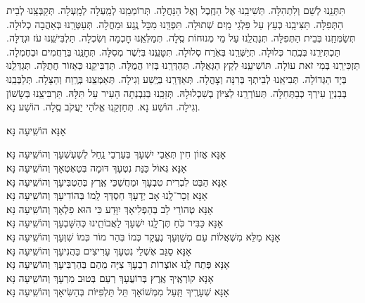 \documentclass[twoside, openany, parskip=half, 11pt]{book}
\begin{document}
תִּתְּנֵֽנוּ לְשֵׁם וְלִתְהִלָּה. תְּשִׁיבֵֽנוּ אֶל הַחֶֽבֶל וְאֶל הַנַּחֲלָה. תְּרוֹמְמֵֽנוּ לְמַֽעְלָה לְמָֽעְלָה. תְּקַבְּצֵֽנוּ לְבֵית הַתְּפִלָּה. תַּצִּיבֵֽנוּ כְּעֵץ עַל פַּלְגֵי מַֽיִם שְׁתוּלָה. תִּפְדֵּֽנוּ מִכׇּל נֶֽגַע וּמַחֲלָה. תְּעַטְּרֵֽנוּ בְּאַהֲבָה כְלוּלָה. תְּשַׂמְּחֵֽנוּ בְּבֵית הַתְּפִלָּה. תְּנַהֲלֵֽנוּ עַל מֵי מְנוּחוֹת סֶֽלָה. תְּמַלְּאֵֽנוּ חׇכְמָה וְשִׂכְלָה. תַּלְבִּישֵֽׁנוּ עֹז וּגְדֻלָּה. תַּכְתִּירֵֽנוּ בְּכֶֽתֶר כְּלוּלָה. תְּיַשְּׁרֵֽנוּ בְּאֹֽרַח סְלוּלָה. תִּטָּעֵֽנוּ בְּיֹֽשֶׁר מְסִלָּה. תְּחׇנֵּֽנוּ בְּרַחֲמִים וּבְחֶמְלָה. תַּזְכִּירֵֽנוּ בְּמִי זֹאת עוֹלָה. תּוֹשִׁיעֵֽנוּ לְקֵץ הַגְּאֻלָּה. תְּהַדְּרֵֽנוּ בְּזִיו הֲמֻלָּה. תַּדְבִּיקֵֽנוּ כְּאֵזוֹר חֲתֻלָּה. תְּגַדְּלֵֽנוּ בְּיָד הַגְּדוֹלָה. תְּבִיאֵֽנוּ לְבֵיתְךָ בְּרִנָּה וְצׇהֳלָה. תְּאַדְּרֵֽנוּ בְּיֶֽשַׁע וְגִילָה. תְּאַמְּצֵֽנוּ בְּרֶֽוַח וְהַצָּלָה. תְּלַבְּבֵֽנוּ בְּבִנְיַן עִירְךָ כְּבַתְּחִלָּה. תְּעוֹרְרֵֽנוּ לְצִיּוֹן בְשִׁכְלוּלָהּ. תְּזַכֵּֽנוּ בְּנִבְנְתָה הָעִיר עַל תִּלָּהּ. תַּרְבִּיצֵֽנוּ בְּשָׂשׁוֹן וְגִילָה. הוֹשַׁע נָא. תְּחַזְקֵֽנוּ אֱלֹהֵי יַעֲקֹב סֶֽלָה. הוֹשַׁע נָא. 

\begin{large}אָנָּא הוֹשִֽׁיעָה נָּא׃\end{large}

\begin{small}
אָנָּא אֱזוֹן חִין תְּאֵבֵי יִשְׁעָךְ בְּעַרְבֵי נַֽחַל לְשַׁעְשְׁעָךְ \hfill וְהוֹשִֽׁיעָה נָּא׃\\
אָנָּא גְּאוֹל כַּנַּת נִטְעָךְ דּוּמָה בְּטַאְטְאָךְ \hfill וְהוֹשִֽׁיעָה נָּא׃\\
אָנָּא הַבֵּט לִבְרִית טִבְעָךְ וּמַחֲשַׁכֵּי אֶֽרֶץ בְּהַטְבִּיעָךְ \hfill וְהוֹשִֽׁיעָה נָּא׃\\
אָנָּא זְכָר־לָֽנוּ אָב יְדָעָךְ חַסְדְּךָ לָֽמוֹ בְּהוֹדִיעָךְ \hfill וְהוֹשִֽׁיעָה נָּא׃\\
אָנָּא טְהוֹרֵי לֵב בְּהַפְלִיאָךְ יִוָּדַע כִּי הוּא פִלְאָךְ \hfill וְהוֹשִֽׁיעָה נָּא׃\\
אָנָּא כַּבִּיר כֹּֽחַ תֶּן־לָֽנוּ יִשְׁעָךְ לַאֲבוֹתֵֽינוּ כְּהִשָּׁבְעָךְ \hfill וְהוֹשִֽׁיעָה נָּא׃\\
אָנָּא מַלֵּא מִשְׁאֲלוֹת עַם מְשַׁוְּעָךְ נֶעֱקָד כְּמוֹ בְּהַר מוֹר כְּמוֹ שִׁוְּעָךְ \hfill וְהוֹשִֽׁיעָה נָּא׃\\
אָנָּא סַגֵּב אֶשְׁלֵי נִטְעָךְ עָרִיצִים בַּהֲנִיעָךְ \hfill וְהוֹשִֽׁיעָה נָּא׃\\
אָנָּא פְּתַח לָֽנוּ אוֹצְרוֹת רִבְעָךְ צִיָּה מֵהֶם בְּהַרְבִּיעָךְ \hfill וְהוֹשִֽׁיעָה נָּא׃\\
אָנָּא קוֹרְאֶֽיךָ אֶֽרֶץ בְּרוֹעֲעָךְ רְעֵם בְּטוּב מִרְעָךְ \hfill וְהוֹשִֽׁיעָה נָּא׃\\
אָנָּא שְׁעָרֶֽיךָ תַּֽעַל מִמְּשׁוֹאָךְ תֵּל תַּלְפִּיּוֹת בְּהַשִּׂיאָךְ \hfill וְהוֹשִֽׁיעָה נָּא׃

\end{small}
\end{document}
